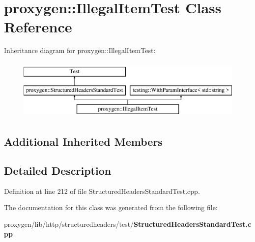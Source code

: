 \section{proxygen\+:\+:Illegal\+Item\+Test Class Reference}
\label{classproxygen_1_1IllegalItemTest}
Inheritance diagram for proxygen\+:\+:Illegal\+Item\+Test\+:\begin{figure}[H]
\begin{center}
\leavevmode
\includegraphics[height=3.000000cm]{classproxygen_1_1IllegalItemTest}
\end{center}
\end{figure}
\subsection*{Additional Inherited Members}


\subsection{Detailed Description}


Definition at line 212 of file Structured\+Headers\+Standard\+Test.\+cpp.



The documentation for this class was generated from the following file\+:\begin{DoxyCompactItemize}
\item 
proxygen/lib/http/structuredheaders/test/{\bf Structured\+Headers\+Standard\+Test.\+cpp}\end{DoxyCompactItemize}

